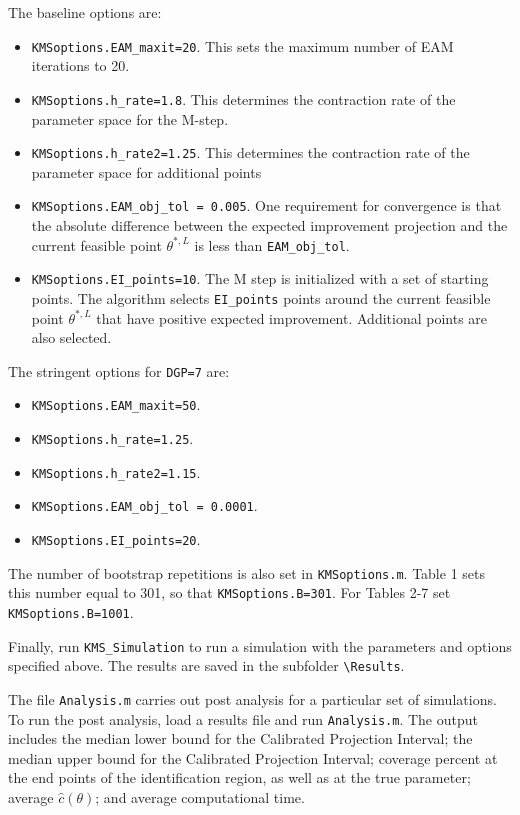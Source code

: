\documentclass[12pt]{article}
\def\code#1{\texttt{#1}}
\begin{document}
The baseline options are:
\begin{itemize}
\item  \code{KMSoptions.EAM\_maxit=20}. This sets the maximum number of EAM iterations to 20.
\item \code{KMSoptions.h\_rate=1.8}. This determines the contraction rate of the parameter space for the M-step.
\item \code{KMSoptions.h\_rate2=1.25}.  This determines the contraction rate of the parameter space for additional points
\item \code{KMSoptions.EAM\_obj\_tol  = 0.005}.  One requirement for convergence is that the absolute difference between the expected improvement projection and the current feasible point $\theta^{*,L}$ is less than  \code{EAM\_obj\_tol}.
\item \code{KMSoptions.EI\_points=10}.  The M step is initialized with a set of starting points.  The algorithm selects \code{EI\_points} points around the current feasible point $\theta^{*,L}$ that have positive expected improvement.  Additional points are also selected.
\end{itemize}
The stringent options for \code{DGP=7} are:
\begin{itemize}
\item  \code{KMSoptions.EAM\_maxit=50}.
\item \code{KMSoptions.h\_rate=1.25}.
\item \code{KMSoptions.h\_rate2=1.15}.
\item \code{KMSoptions.EAM\_obj\_tol  = 0.0001}.
\item \code{KMSoptions.EI\_points=20}.
\end{itemize}
The number of bootstrap repetitions is also set in \code{KMSoptions.m}.  Table 1 sets this number equal to 301, so that \code{KMSoptions.B=301}.  For Tables 2-7 set \code{KMSoptions.B=1001}.

Finally, run \code{KMS\_Simulation} to run a simulation with the parameters and options specified above.  The results are saved in the subfolder \code{\textbackslash Results}.

The file \code{Analysis.m} carries out post analysis for a particular set of simulations.  To run the post analysis, load a results file and run \code{Analysis.m}.  The output includes the median lower bound for the Calibrated Projection Interval; the median upper bound for the Calibrated Projection Interval; coverage percent at the end points of the identification region, as well as at the true parameter; average $\hat c(\theta)$; and average computational time.
\end{document}
